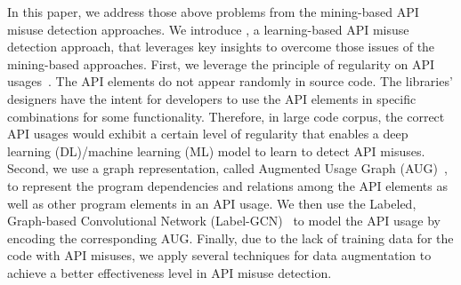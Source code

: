 
In this paper, we address those above problems from the mining-based
API misuse detection approaches. We introduce {\tool}, a
learning-based API misuse detection approach, that leverages key
insights to overcome those issues of the mining-based approaches.
First, we leverage the principle of regularity on API
usages~\cite{NNP+09}. The API elements do not appear randomly in
source code. The libraries' designers have the intent for developers
to use the API elements in specific combinations for some
functionality. Therefore, in large code corpus, the correct API usages
would exhibit a certain level of regularity that enables a deep
learning (DL)/machine learning (ML) model to learn to detect API
misuses.
%
Second, we use a graph representation, called Augmented Usage Graph
(AUG)~\cite{mudetect-msr19}, to represent the program dependencies and
relations among the API elements as well as other program elements in
an API usage. We then use the Labeled, Graph-based Convolutional
Network (Label-GCN)~\cite{label-gcn} to model the API usage by
encoding the corresponding AUG. Finally, due to the lack of training
data for the code with API misuses, we apply several techniques for
data augmentation to achieve a better effectiveness level in API
misuse detection.

